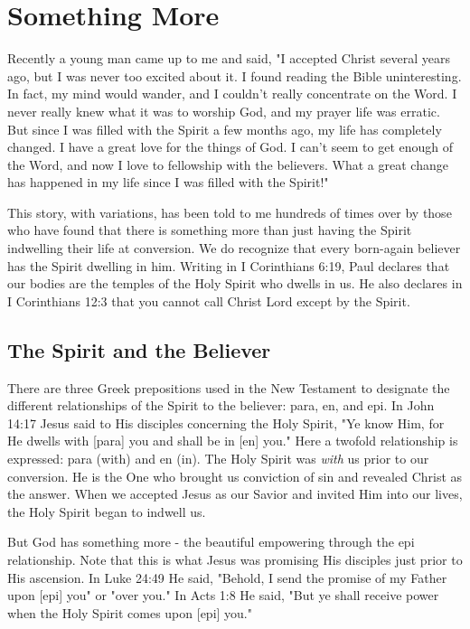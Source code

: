 \chapter{Something More}

Recently a young man came up to me and said, "I accepted Christ several years ago, but I was never too excited about it. I found reading the Bible uninteresting. In fact, my mind would wander, and I couldn't really concentrate on the Word. I never really knew what it was to worship God, and my prayer life was erratic. But since I was filled with the Spirit a few months ago, my life has completely changed. I have a great love for the things of God. I can't seem to get enough of the Word, and now I love to fellowship with the believers. What a great change has happened in my life since I was filled with the Spirit!" 

This story, with variations, has been told to me hundreds of times over by those who have found that there is something more than just having the Spirit indwelling their life at conversion. We do recognize that every born-again believer has the Spirit dwelling in him. Writing in I Corinthians 6:19, Paul declares that our bodies are the temples of the Holy Spirit who dwells in us. He also declares in I Corinthians 12:3 that you cannot call Christ Lord except by the Spirit. 

\section*{The Spirit and the Believer}

There are three Greek prepositions used in the New Testament to designate the different relationships of the Spirit to the believer: para, en, and epi. In John 14:17 Jesus said to His disciples concerning the Holy Spirit, "Ye know Him, for He dwells with [para] you and shall be in [en] you." Here a twofold relationship is expressed: para (with) and en (in). The Holy Spirit was \emph{with} us prior to our conversion. He is the One who brought us conviction of sin and revealed Christ as the answer. When we accepted Jesus as our Savior and invited Him into our lives, the Holy Spirit began to indwell us. 

But God has something more - the beautiful empowering through the epi relationship. Note that this is what Jesus was promising His disciples just prior to His ascension. In Luke 24:49 He said, "Behold, I send the promise of my Father upon [epi] you" or "over you." In Acts 1:8 He said, "But ye shall receive power when the Holy Spirit comes upon [epi] you." 

